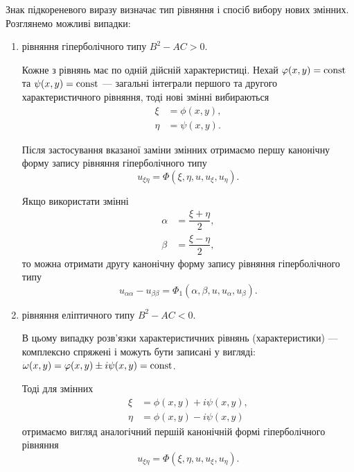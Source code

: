 Знак підкореневого виразу визначає тип рівняння і спосіб вибору нових змінних. Розглянемо можливі випадки:
\begin{enumerate}
	\item рівняння гіперболічного типу $B^2 - AC > 0$. \medskip

	Кожне з рівнянь має по одній дійсній характеристиці. Нехай $\varphi(x,y)=\operatorname{const}$ та $\psi(x,y)=\operatorname{const}$ --- загальні інтеграли першого та другого характеристичного рівняння, тоді нові змінні вибираються
	\begin{align}
		\xi &= \phi(x, y), \\
		\eta &= \psi(x, y).
	\end{align}

	Після застосування вказаної заміни змінних отримаємо першу канонічну форму запису рівняння гіперболічного типу 
	\begin{equation}
		u_{\xi\eta} = \Phi(\xi, \eta, u, u_\xi, u_\eta).
	\end{equation}

	\begin{remark}
		Якщо використати змінні
		\begin{align}
			\alpha &= \dfrac{\xi+\eta}{2}, \\
			\beta &= \dfrac{\xi-\eta}{2},
		\end{align}
		то можна отримати другу канонічну форму запису рівняння гіперболічного типу
		\begin{equation}
			u_{\alpha\alpha} - u_{\beta\beta} = \Phi_1(\alpha, \beta, u, u_\alpha, u_\beta).
		\end{equation}
	\end{remark}

	\item рівняння еліптичного типу $B^2 - AC < 0$. \medskip

	В цьому випадку розв'язки характеристичних рівнянь (характеристики) --- комплексно спряжені і можуть бути записані у вигляді: $\omega(x,y)=\varphi(x,y)\pm i\psi(x,y)=\operatorname{const}$. \medskip

	Тоді для змінних
	\begin{align}
		\xi &= \phi(x,y) + i \psi(x, y), \\
		\eta &= \phi(x, y) - i \psi(x, y)
	\end{align}
	отримаємо вигляд аналогічний першій канонічній формі гіперболічного рівняння
	\begin{equation}
		u_{\xi\eta}=\Phi(\xi,\eta,u,u_\xi,u_\eta).
	\end{equation}


\end{enumerate}
